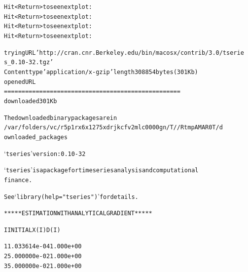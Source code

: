 \documentclass[letterpaper,10pt,english]{/Users/edwsurewin/anaconda/lib/python2.7/site-packages/sphinx/texinputs/sphinxhowto}
\newenvironment{InvisibleVerbatim}
        {\begin{mdframed}[leftmargin=0.1\linewidth,innerleftmargin=3pt,innerrightmargin=3pt, userdefinedwidth=1\linewidth, linewidth=0pt, linecolor=white, usetwoside=false]}
        {\end{mdframed}}
\begin{document}
        

            
                \begin{InvisibleVerbatim}
                \vspace{-0.5\baselineskip}
\begin{alltt}Hit <Return> to see next plot:
Hit <Return> to see next plot:
Hit <Return> to see next plot:
Hit <Return> to see next plot:
\end{alltt}

            \end{InvisibleVerbatim}
            
                \begin{InvisibleVerbatim}
                \vspace{-0.5\baselineskip}
\begin{alltt}trying URL 'http://cran.cnr.Berkeley.edu/bin/macosx/contrib/3.0/tserie
s\_0.10-32.tgz'
Content type 'application/x-gzip' length 308854 bytes (301 Kb)
opened URL
==================================================
downloaded 301 Kb


The downloaded binary packages are in
        /var/folders/vc/r5p1rx6x1275xdrjkcfv2mlc0000gn/T//RtmpAMAR0T/d
ownloaded\_packages

    ‘tseries’ version: 0.10-32

    ‘tseries’ is a package for time series analysis and computational
    finance.

    See ‘library(help="tseries")’ for details.


 ***** ESTIMATION WITH ANALYTICAL GRADIENT *****


     I     INITIAL X(I)        D(I)

     1     1.033614e-04     1.000e+00
     2     5.000000e-02     1.000e+00
     3     5.000000e-02     1.000e+00


\end{alltt}
\end{InvisibleVerbatim}
\end{document}
